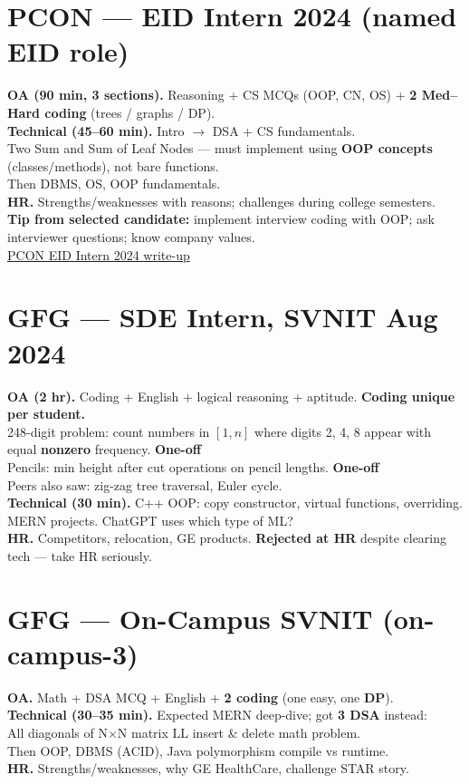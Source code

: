 \documentclass[11pt,a4paper]{article}
\newcommand{\tg}[1]{\textcolor{tag}{\textbf{\footnotesize #1}}}
\newcommand{\rnd}[1]{\textcolor{accent}{\textbf{#1}}}
\newcommand{\q}[1]{\textcolor{qcol}{#1}}
\newcommand{\card}[1]{%
  \par\vspace{5pt}%
  \noindent\colorbox{soft}{%
    \parbox{\dimexpr\textwidth-2\fboxsep}{\vspace{6pt}#1\vspace{6pt}}%
  }\par\vspace{7pt}%
}
\begin{document}
\section{PCON --- EID Intern 2024 (named EID role)}
\card{
\rnd{OA (90 min, 3 sections).} Reasoning + CS MCQs (OOP, CN, OS) + \textbf{2 Med--Hard coding} (trees / graphs / DP).\\[4pt]
\rnd{Technical (45--60 min).} Intro $\rightarrow$ DSA + CS fundamentals.\\
\q{Two Sum} and \q{Sum of Leaf Nodes} --- must implement using \textbf{OOP concepts} (classes/methods), not bare functions.\\
Then DBMS, OS, OOP fundamentals.\\[4pt]
\rnd{HR.} Strengths/weaknesses with reasons; challenges during college semesters.\\[3pt]
\textbf{Tip from selected candidate:} implement interview coding with OOP; ask interviewer questions; know company values.\\
\href{https://pcon-app.vercel.app/blogs/cltfdffwe0003k1a1zpsw2i5g}{PCON EID Intern 2024 write-up}
}

\section{GFG --- SDE Intern, SVNIT Aug 2024}
\card{
\rnd{OA (2 hr).} Coding + English + logical reasoning + aptitude. \textbf{Coding unique per student.}\\[3pt]
\q{248-digit problem:} count numbers in $[1,n]$ where digits 2, 4, 8 appear with equal \textbf{nonzero} frequency. \tg{One-off}\\
\q{Pencils:} min height after cut operations on pencil lengths. \tg{One-off}\\
Peers also saw: zig-zag tree traversal, Euler cycle.\\[4pt]
\rnd{Technical (30 min).} C++ OOP: copy constructor, virtual functions, overriding. MERN projects. \q{ChatGPT uses which type of ML?}\\[4pt]
\rnd{HR.} Competitors, relocation, GE products. \textbf{Rejected at HR} despite clearing tech --- take HR seriously.
}

\section{GFG --- On-Campus SVNIT (on-campus-3)}
\card{
\rnd{OA.} Math + DSA MCQ + English + \textbf{2 coding} (one easy, one \textbf{DP}).\\[4pt]
\rnd{Technical (30--35 min).} Expected MERN deep-dive; got \textbf{3 DSA} instead:\\
\q{All diagonals of N$\times$N matrix} \quad \q{LL insert \& delete} \quad math problem.\\[3pt]
Then OOP, DBMS (ACID), Java polymorphism compile vs runtime.\\[4pt]
\rnd{HR.} Strengths/weaknesses, why GE HealthCare, challenge STAR story.
}
\end{document}
